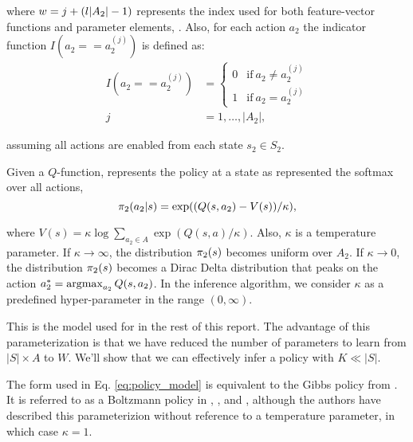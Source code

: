     \noindent
    where $w=j+(l|A_2|-1)$ represents the index used for both feature-vector functions and parameter elements,
    \paramElem. Also, for each action $a_2$ the indicator function ${I(a_2==a_2^{(j)})}$ is defined as:
    \begin{equation*}
        \begin{aligned}
            I(a_2==a_2^{(j)}) & = \begin{cases}
                                    0 & \text{if}\ a_2 \neq a_2^{(j)} \\
                                    1 & \text{if}\ a_2 = a_2^{(j)}
                                  \end{cases} \\
            j & = 1, \ldots, |A_2|,
        \end{aligned}
    \end{equation*}

    \noindent
    assuming all actions are enabled from each state $s_2 \in S_2$.

    Given a $Q$-function, \cite{nachum2017bridging} represents the policy at a state as represented the softmax over all
    actions,
    \begin{equation}\label{eq:policy_model}
        \pi_{2}(a_2|s) = \exp((Q(s,a_2)- V(s))/\kappa),
    \end{equation}

    \noindent
    where $V(s) = \kappa\log \sum_{a_2\in A}\exp (Q(s,a)/\kappa)$. Also, $\kappa$ is a temperature parameter. If $\kappa
    \rightarrow \infty$, the distribution $ \pi_{2}(s) $ becomes uniform over $A_2$. If $\kappa \rightarrow 0$, the
    distribution $\pi_{2}(s)$ becomes a Dirac Delta distribution that peaks on the action $a_2^\ast = \mathop{\mathrm{argmax}}_{a_2}
    Q(s,a_2)$. In the inference algorithm, we consider $\kappa$ as a predefined hyper-parameter in the range
    $(0,\infty)$.

    This is the model used for  in the rest of this report. The advantage of this parameterization is that we
    have reduced the number of parameters to learn from $|S|\times A$ to $W$. We'll show that we can effectively infer a
    policy with $K \ll |S|$.

    The form used in Eq. \ref{eq:policy_model} is equivalent to the Gibbs policy from \cite{Sugiyama2015StatisticalRL}.
    It is referred to as a Boltzmann policy in \cite{Hanawal2017LearningPolicies}, \cite{khamassi2017active}, and
    \cite{herman2016inverse}, although the authors have described this parameterizion without reference to a temperature
    parameter, in which case $\kappa=1$.

